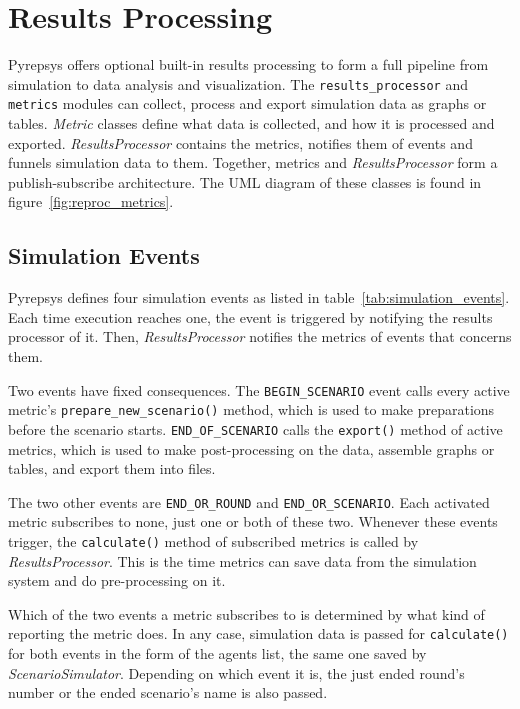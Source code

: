 \documentclass[%
    ]{\PathToTumTemplate/thesis/tum_thesis}
\begin{document}
\section{Results Processing}\label{sec:impl_results_processing}
Pyrepsys offers optional built-in results processing to form a full pipeline from simulation to data analysis and visualization.
The \lstinline{results_processor} and \lstinline{metrics} modules can collect, process and export simulation data as graphs or tables.
\emph{Metric} classes define what data is collected, and how it is processed and exported.
\emph{ResultsProcessor} contains the metrics, notifies them of events and funnels simulation data to them.
Together, metrics and \emph{ResultsProcessor} form a publish-subscribe architecture.
The UML diagram of these classes is found in figure~\ref{fig:reproc_metrics}.


\subsection{Simulation Events}

Pyrepsys defines four simulation events as listed in table~\ref{tab:simulation_events}.
Each time execution reaches one, the event is triggered by notifying the results processor of it.
Then, \emph{ResultsProcessor} notifies the metrics of events that concerns them.

Two events have fixed consequences.
The \lstinline{BEGIN_SCENARIO} event calls every active metric's \lstinline{prepare_new_scenario()} method, which is used to make preparations before the scenario starts.
\lstinline{END_OF_SCENARIO} calls the \lstinline{export()} method of active metrics, which is used to make post-processing on the data, assemble graphs or tables, and export them into files.

The two other events are \lstinline{END_OR_ROUND} and \lstinline{END_OR_SCENARIO}.
Each activated metric subscribes to none, just one or both of these two.
Whenever these events trigger, the \lstinline{calculate()} method of subscribed metrics is called by \emph{ResultsProcessor}.
This is the time metrics can save data from the simulation system and do pre-processing on it.

Which of the two events a metric subscribes to is determined by what kind of reporting the metric does.
In any case, simulation data is passed for \lstinline{calculate()} for both events in the form of the agents list, the same one saved by \emph{ScenarioSimulator}.
Depending on which event it is, the just ended round's number or the ended scenario's name is also passed.
\end{document}

